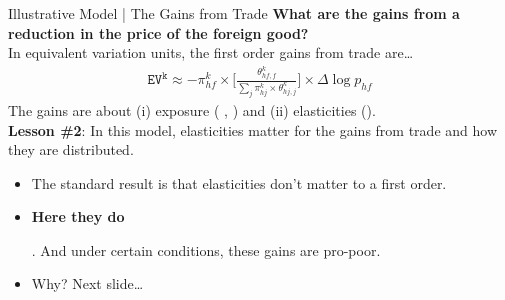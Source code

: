 \documentclass[9pt,pdftex,aspectratio=1610]{beamer}
\theoremstyle{definition}
\begin{document}
\begin{frame}[t]{Illustrative Model | The Gains from Trade}
\smallskip
\textbf{What are the gains from a reduction in the price of the foreign good?}\\
\bigskip
In equivalent variation units, the first order gains from trade are\ldots
\begin{align*}
\mathtt{EV^k} \approx -\pi_{hf}^k \times \bigg [ \frac{ \theta_{hf,f}^k }{ \sum\limits_{j} \pi_{hj}^k \times \theta_{hj,j}^k}  \bigg] \times \Delta\log{p}_{hf}
\end{align*}
The gains are about (i) exposure ( {\small \citet{deaton1989rice}, \citet{borusyak2021distributional} }) and (ii) elasticities ({\small \citet*{auer2022unequal}}).\\
\bigskip
\textbf{Lesson \#2}: In this model, elasticities matter for the gains from trade and how they are distributed.
\begin{itemize}
\smallskip
\item The standard result is that elasticities don't matter to a first order.
\smallskip
\item \begin{alert}{\textbf{Here they do}}\end{alert}. And under certain conditions, these gains are pro-poor.
\smallskip
\item Why? Next slide\ldots
\end{itemize}
\end{frame}
\end{document}
